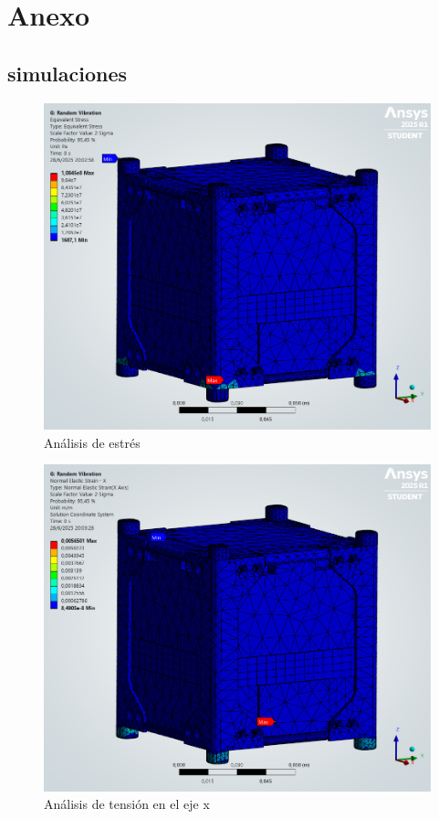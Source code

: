 \pagestyle{empty}
\chapter{Anexo}

\section{simulaciones}

  \begin{figure}[H]
    \centering
    \includegraphics[width=15cm]{image/fem/ansys_cubesat-vibration_stress.png}
    \caption{Análisis de estrés}
    \label{fig:fem_stress}
  \end{figure}

  \begin{figure}[H]
    \centering
    \includegraphics[width=14cm]{image/fem/ansys_cubesat-vibration_strain-x.png}
    \caption{Análisis de tensión en el eje x}
    \label{fig:fem_strain-x}
  \end{figure}

